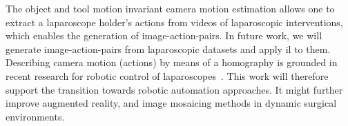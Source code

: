 
The object and tool motion invariant camera motion estimation allows one to extract a laparoscope holder's actions from videos of laparoscopic interventions, which enables the generation of image-action-pairs. In future work, we will generate image-action-pairs from laparoscopic datasets and apply \gls{il} to them. Describing camera motion (actions) by means of a homography is grounded in recent research for robotic control of laparoscopes~\cite{huber2021homographybased}. This work will therefore support the transition towards robotic automation approaches. It might further improve augmented reality, and image mosaicing methods in dynamic surgical environments.

